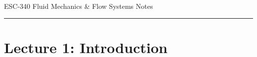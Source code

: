 ﻿\documentclass[12pt]{article}
\begin{document}
\begin{center}
{\LARGE ESC-340 Fluid Mechanics \& Flow Systems Notes\par}
\end{center}
\hrule
\vspace{1.5em}

\section*{Lecture 1: Introduction}
\end{document}
